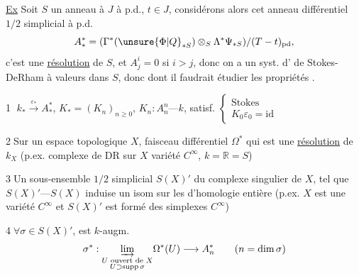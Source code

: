 \uline{Ex} Soit $S$ un anneau à  $J$ à p.d., $t\in J$, considérons alors cet anneau différentiel $1/2$ simplicial à p.d.
\[
A_*^*=(\Gamma^*(\unsure{\Phi|Q}_{*S})\otimes_S\Lambda^*\Psi_{*S})/(T-t)_{\mathrm{pd}},
\]
c'est une \uline{résolution} de $S$, et $A_j^i=0$ si $i>j$, donc on a un syst. d' de Stokes-DeRham à valeurs dans $S$, donc
dont il faudrait étudier les propriétés .


\textcircled{1}\quad
$k_*\xrightarrow{\varepsilon_*}A_*^*$,
$K_*=(K_n)_{n\geq0}$,
$K_n:A_n^n\text{---}k$, satisf.
$\left\{\begin{array}{l}\text{Stokes}\\ K_0\varepsilon_0=\mathrm{id}\end{array}\right.$

\textcircled{2}\quad Sur un  espace topologique $X$,
faisceau différentiel 
 $\Omega^*$ qui est une \uline{résolution} de $k_X$
(p.ex. complexe de DR sur $X$ variété $C^\infty$, $k=\mathbb R=S$)

\textcircled{3}\quad Un sous-ensemble $1/2$ simplicial $S(X)'$ du complexe singulier de $X$, tel que
$S(X)'\text{---}S(X)$  induise un isom sur les  d'homologie entière
(p.ex. $X$ est une variété $C^\infty$ et $S(X)'$ est formé des simplexes $C^\infty$)


\textcircled{4}\quad $\forall\sigma\in S(X)'$, est
 $k$-augm.
\[
\sigma^*:\underset{\substack{U\text{ ouvert de }X\\ U\supset\operatorname{supp}\sigma}}{\varinjlim}
\Omega^*(U)\longrightarrow A_n^*
\qquad(n=\dim\sigma)
\]

